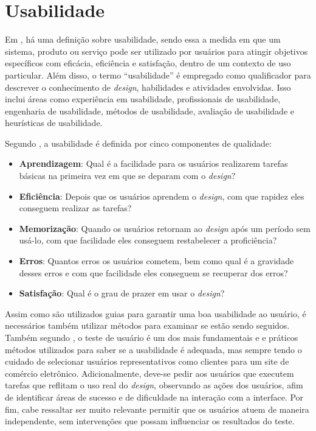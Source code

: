 \section{Usabilidade} 
    \label{Usabilidade}

Em , há uma definição sobre usabilidade, sendo essa a medida em que um sistema, produto ou serviço pode ser utilizado por usuários para atingir objetivos específicos com eficácia, eficiência e satisfação, dentro de um contexto de uso particular. Além disso, o termo ``usabilidade'' é empregado como qualificador para descrever o conhecimento de \textit{design}, habilidades e atividades envolvidas. Isso inclui áreas como experiência em usabilidade, profissionais de usabilidade, engenharia de usabilidade, métodos de usabilidade, avaliação de usabilidade e heurísticas de usabilidade.

Segundo , a usabilidade é definida por cinco componentes de qualidade:

\begin{itemize}
    \item \textbf{Aprendizagem}: Qual é a facilidade para os usuários realizarem tarefas básicas na primeira vez em que se deparam com o \textit{design}?
    \item \textbf{Eficiência}: Depois que os usuários aprendem o \textit{design}, com que rapidez eles conseguem realizar as tarefas?
    \item \textbf{Memorização}: Quando os usuários retornam ao \textit{design} após um período sem usá-lo, com que facilidade eles conseguem restabelecer a proficiência?
    \item \textbf{Erros}: Quantos erros os usuários cometem, bem como qual é a gravidade desses erros e com que facilidade eles conseguem se recuperar dos erros?
    \item \textbf{Satisfação}: Qual é o grau de prazer em usar o \textit{design}?
\end{itemize}

Assim como são utilizados guias para garantir uma boa usabilidade ao usuário, é necessários também utilizar métodos para examinar se estão sendo seguidos. Também segundo , o teste de usuário é um dos mais fundamentais e e práticos métodos utilizados para saber se a usabilidade é adequada, mas sempre tendo o cuidado de selecionar usuários representativos como clientes para um site de comércio eletrônico. Adicionalmente, deve-se pedir aos usuários que executem tarefas que reflitam o uso real do \textit{design}, observando as ações dos usuários, afim de identificar áreas de sucesso e de dificuldade na interação com a interface. Por fim, cabe ressaltar ser muito relevante permitir que os usuários atuem de maneira independente, sem intervenções que possam influenciar os resultados do teste.

